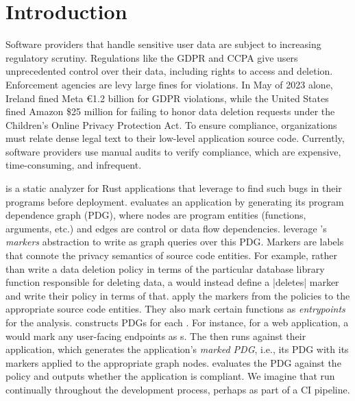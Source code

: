 \section{Introduction}
\label{sec:intro}

Software providers that handle sensitive user data are subject to increasing regulatory scrutiny.
%
Regulations like the GDPR and CCPA give users unprecedented control over their data, including rights to access and deletion.
%
Enforcement agencies are levy large fines for violations.
%
In May of 2023 alone, Ireland fined Meta €1.2 billion for GDPR violations, 
while the United States fined Amazon \$25 million for failing to honor data deletion requests under the Children’s Online Privacy Protection Act.\cite{todo}
To ensure compliance, organizations must relate dense legal text to their low-level application source code.
%
Currently, software providers use manual audits to verify compliance, which are expensive, time-consuming,
and infrequent.~\cite{todo}

\sys{} is a static analyzer for Rust applications that \devs{} leverage to find such bugs in their programs before deployment.
%
\sys{} evaluates an application by generating its program dependence graph (PDG), 
where nodes are program entities (functions, arguments, etc.) and edges are control or data flow dependencies.
%
\Writers{} leverage \sys{}'s \emph{markers} abstraction to write \policies{} as graph queries over this PDG.
%
Markers are labels that connote the privacy semantics of source code entities.
%
For example, rather than write a data deletion policy in terms of the particular database library function responsible for deleting data,
a \writer{} would instead define a |deletes| marker and write their policy in terms of that.
%
\Devs{} apply the markers from the policies to the appropriate source code entities.
%
They also mark certain functions as \emph{entrypoints} for the analysis.
%
\sys{} constructs PDGs for each \controller{}.
%
For instance, for a web application, a \dev{} would mark any user-facing endpoints as \controller{}s.
%
The \dev{} then runs \sys{} against their application, which generates the application's \emph{marked PDG},
i.e., its PDG with its markers applied to the appropriate graph nodes.
%
\sys{} evaluates the PDG against the policy and outputs whether the application is compliant.
%
We imagine that \devs{} run \sys{} continually throughout the development process, perhaps as part of a CI pipeline.

